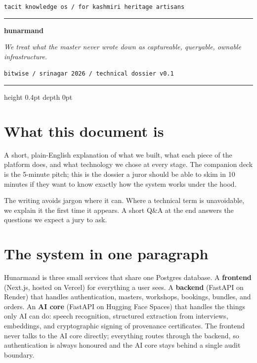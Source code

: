 \documentclass[11pt,a4paper]{article}
\begin{document}
\pagestyle{empty}

\begingroup
  \raggedright
  {\fontsize{9pt}{11pt}\selectfont\color{faded}\texttt{tacit knowledge os \quad / \quad for kashmiri heritage artisans}}
  \par\vspace{0.4em}
  \textcolor{rouge}{\rule{2.6cm}{0.6pt}}
  \par\vspace{0.6em}
  {\fontsize{36pt}{40pt}\selectfont\bfseries hunarmand}
  \par\vspace{0.3em}
  {\fontsize{14pt}{18pt}\selectfont\itshape\color{faded}
  We treat what the master never wrote down as captureable, queryable, ownable infrastructure.}
  \par\vspace{1em}
  {\fontsize{9pt}{11pt}\selectfont\color{muted}\texttt{bitwise \quad / \quad srinagar 2026 \quad / \quad technical dossier v0.1}}
\endgroup

\vspace{1.2em}
\hrule height 0.4pt depth 0pt
\vspace{1.2em}

\section*{What this document is}

A short, plain-English explanation of what we built, what each piece of
the platform does, and what technology we chose at every stage. The
companion deck is the 5-minute pitch; this is the dossier a juror
should be able to skim in 10 minutes if they want to know exactly how
the system works under the hood.

The writing avoids jargon where it can. Where a technical term is
unavoidable, we explain it the first time it appears. A short Q\&A at
the end answers the questions we expect a jury to ask.

\section{The system in one paragraph}

Hunarmand is three small services that share one Postgres database.
A \textbf{frontend} (Next.js, hosted on Vercel) for everything a user
sees. A \textbf{backend} (FastAPI on Render) that handles authentication,
masters, workshops, bookings, bundles, and orders. An \textbf{AI core}
(FastAPI on Hugging Face Spaces) that handles the things only AI can do:
speech recognition, structured extraction from interviews, embeddings,
and cryptographic signing of provenance certificates. The frontend
never talks to the AI core directly; everything routes through the
backend, so authentication is always honoured and the AI core stays
behind a single audit boundary.
\end{document}
